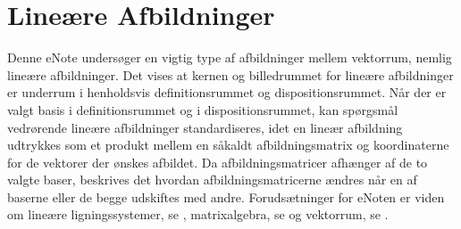 
\setcounter{chapter}{7} %

\chapter{Lineære Afbildninger} \label{tn8}

\begin{basis}
Denne eNote undersøger en vigtig type af afbildninger mellem vektorrum, nemlig lineære afbildninger. Det vises at kernen og billedrummet for lineære afbildninger er underrum i henholdsvis definitionsrummet og dispositionsrummet. Når der er valgt basis i definitionsrummet og i dispositionsrummet, kan spørgsmål vedrørende lineære afbildninger standardiseres, idet en lineær afbildning udtrykkes som et produkt mellem en såkaldt afbildningsmatrix og koordinaterne for de vektorer der ønskes afbildet. Da afbildningsmatricer afhænger af de to valgte baser, beskrives det hvordan afbildningsmatricerne ændres når en af baserne eller de begge udskiftes med andre. Forudsætninger for eNoten er viden om lineære ligningssystemer, se , matrixalgebra, se  og vektorrum, se .
\end{basis}

